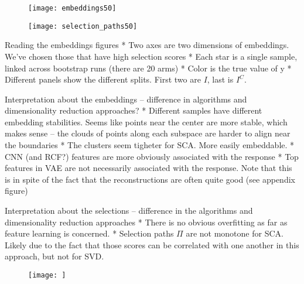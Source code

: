 \begin{figure}
  \centering
  \texttt{[image: embeddings50]}
  \caption{}
  \label{fig:}
\end{figure}

\begin{figure}
  \centering
  \texttt{[image: selection\_paths50]}
  \caption{}
  \label{fig:}
\end{figure}


Reading the embeddings figures
* Two axes are two dimensions of embeddings. We've chosen those that have high
selection scores
* Each star is a single sample, linked across bootstrap runs (there are 20 arms)
* Color is the true value of y
* Different panels show the different splits. First two are $I$, last is
$I^{C}$.

Interpretation about the embeddings -- difference in algorithms and
dimensionality reduction approaches?
* Different samples have different embedding stabilities. Seems like points near
the center are more stable, which makes sense -- the clouds of points along each
subspace are harder to align near the boundaries
* The clusters seem tigheter for SCA. More easily embeddable.
* CNN (and RCF?) features are more obviously associated with the response
* Top features in VAE are not necessarily associated with the response. Note
that this is in spite of the fact that the reconstructions are often quite good
(see appendix figure)

Interpretation about the selections -- difference in the algorithms and
dimensionality reduction approaches
* There is no obvious overfitting as far as feature learning is concerned.
* Selection paths $\Pi$ are not monotone for SCA. Likely due to the fact that
those scores can be correlated with one another in this approach, but not for
SVD.

\begin{figure}
  \centering
  \texttt{[image: ]}
  \caption{}
  \label{fig:}
\end{figure}

